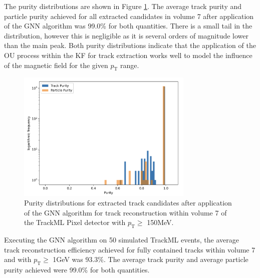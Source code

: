 The purity distributions are shown in Figure \ref{fig:trackml-results-endcap-purity}. The average track purity and particle purity achieved for all extracted candidates in volume 7 after application of the GNN algorithm was 99.0\% for both quantities. There is a small tail in the distribution, however this is negligible as it is several orders of magnitude lower than the main peak. Both purity distributions indicate that the application of the OU process within the KF for track extraction works well to model the influence of the magnetic field for the given $p_{\text{T}}$ range.

\begin{figure}[htbp]
    \centering
    \includegraphics[width=0.75\textwidth]{images/7-results/endcap-purity-log.png}
    \caption{Purity distributions for extracted track candidates after application of the GNN algorithm for track reconstruction within volume 7 of the TrackML Pixel detector with $p_{\text{T}} \geq$ 150MeV.}
    \label{fig:trackml-results-endcap-purity}%
\end{figure}


Executing the GNN algorithm on 50 simulated TrackML events, the average track reconstruction efficiency achieved for fully contained tracks within volume 7 and with $p_{\text{T}} \geq$ 1GeV was 93.3\%. The average track purity and average particle purity achieved were 99.0\% for both quantities.








